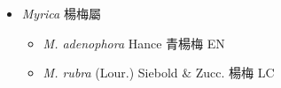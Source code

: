 
  \begin{itemize}
 \item[] \textit{Myrica} 楊梅屬
                                
  \begin{itemize}
        \item[] \textit{M. adenophora} Hance  青楊梅   EN
        \item[] \textit{M. rubra} (Lour.) Siebold \& Zucc.  楊梅   LC
  \end{itemize}
  \end{itemize}
